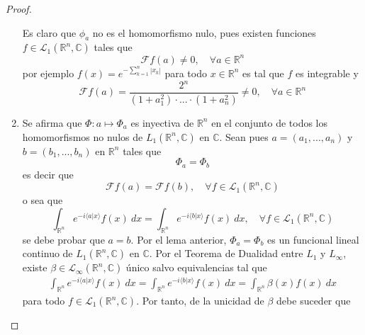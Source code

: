 \documentclass[12pt]{report}
\theoremstyle{largebreak}
\newcommand\abs[1]{\ensuremath{\left|#1\right|}}
\newcommand\pint[2]{\ensuremath{\langle#1| #2\rangle}}
\newcommand{\fou}[1]{\ensuremath{\mathcal{F}#1}}
\begin{document}
\begin{proof}
\begin{enumerate}
            Es claro que $\phi_a$ no es el homomorfismo nulo, pues existen funciones $f\in\mathcal{L}_1(\mathbb{R}^n,\mathbb{C})$ tales que
            \begin{equation*}
                \fou{f}(a)\neq0,\quad\forall a\in\mathbb{R}^n
            \end{equation*}
            por ejemplo $f(x)=e^{ -\sum_{ k=1}^n \abs{x_k}}$ para todo $x\in\mathbb{R}^n$ es tal que $f$ es integrable y
            \begin{equation*}
                \fou{f}(a)=\frac{2^n}{(1+a_1^2)\cdot...\cdot(1+a_n^2)}\neq0,\quad\forall a\in\mathbb{R}^n
            \end{equation*}
            \item Se afirma que $\Phi:a\mapsto\Phi_a$ es inyectiva de $\mathbb{R}^n$ en el conjunto de todos los homomorfismos no nulos de $L_1(\mathbb{R}^n,\mathbb{C})$ en $\mathbb{C}$. Sean pues $a=(a_1,...,a_n)$ y $b=(b_1,...,b_n)$ en $\mathbb{R}^n$ tales que
            \begin{equation*}
                \Phi_a=\Phi_b
            \end{equation*}
            es decir que
            \begin{equation*}
                \fou{f}(a)=\fou{f}(b),\quad\forall f\in\mathcal{L}_1(\mathbb{R}^n,\mathbb{C})
            \end{equation*}
            o sea que
            \begin{equation*}
                \int_{\mathbb{R}^n}e^{ -i\pint{a}{x}}f(x)\:dx=\int_{\mathbb{R}^n}e^{ -i\pint{b}{x}}f(x)\:dx,\quad\forall f\in\mathcal{L}_1(\mathbb{R}^n,\mathbb{C})
            \end{equation*}
            se debe probar que $a=b$. Por el lema anterior, $\Phi_a=\Phi_b$ es un funcional lineal continuo de $L_1(\mathbb{R}^n,\mathbb{C})$ en $\mathbb{C}$. Por el Teorema de Dualidad entre $L_1$ y $L_\infty$, existe $\beta\in\mathcal{L}_{\infty}(\mathbb{R}^n,\mathbb{C})$ único salvo equivalencias tal que
            \begin{equation*}
                \begin{split}
                    \int_{\mathbb{R}^n}e^{ -i\pint{a}{x}}f(x)\:dx=\int_{\mathbb{R}^n}e^{ -i\pint{b}{x}}f(x)\:dx=\int_{\mathbb{R}^n}\beta(x)f(x)\:dx
                \end{split}
            \end{equation*}
            para todo $f\in\mathcal{L}_1(\mathbb{R}^n,\mathbb{C})$. Por tanto, de la unicidad de $\beta$ debe suceder que

\end{enumerate}
\end{proof}
\end{document}
